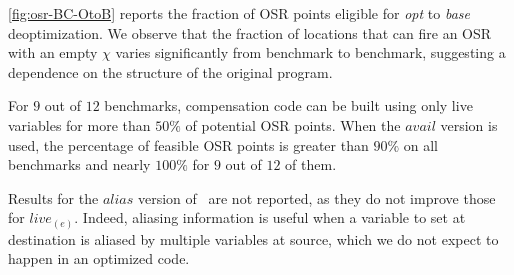 \myfigure\ref{fig:osr-BC-OtoB} reports the fraction of OSR points eligible for {\em opt} to {\em base} deoptimization. We observe that the fraction of locations that can fire an OSR with an empty $\chi$ varies significantly from benchmark to benchmark, suggesting a dependence on the structure of the original program.

For $9$ out of $12$ benchmarks, compensation code can be built using only live variables for more than $50\%$ of potential OSR points.
When the $avail$ version is used, the percentage of feasible OSR points is greater than $90\%$ on all benchmarks and nearly $100\%$ for $9$ out of $12$ of them.

Results for the $alias$ version of \reconstruct\ are not reported, as they do not improve those for $live_{(e)}$. Indeed, aliasing information is useful when a variable to set at destination is aliased by multiple variables at source, which we do not expect to happen in an optimized code.

